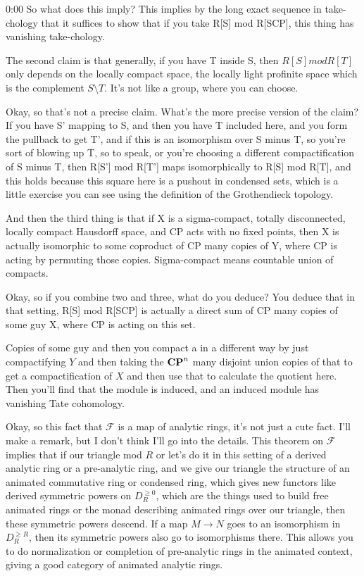 \begin{unfinished}{0:00}
So what does this imply? This implies by the long exact sequence in take-chology that it suffices to show that if you take R[S] mod R[SCP], this thing has vanishing take-chology.

The second claim is that generally, if you have T inside S, then $R[S] mod R[T]$ only depends on the locally compact space, the locally light profinite space which is the complement $S\setminus T$. It's not like a group, where you can choose.

Okay, so that's not a precise claim. What's the more precise version of the claim? If you have S' mapping to S, and then you have T included here, and you form the pullback to get T', and if this is an isomorphism over S minus T, so you're sort of blowing up T, so to speak, or you're choosing a different compactification of S minus T, then R[S'] mod R[T'] maps isomorphically to R[S] mod R[T], and this holds because this square here is a pushout in condensed sets, which is a little exercise you can see using the definition of the Grothendieck topology.

And then the third thing is that if X is a sigma-compact, totally disconnected, locally compact Hausdorff space, and CP acts with no fixed points, then X is actually isomorphic to some coproduct of CP many copies of Y, where CP is acting by permuting those copies. Sigma-compact means countable union of compacts.

Okay, so if you combine two and three, what do you deduce? You deduce that in that setting, R[S] mod R[SCP] is actually a direct sum of CP many copies of some guy X, where CP is acting on this set.

Copies of some guy and then you compact a in a different way by just compactifying $Y$ and then taking the $\mathbf{CP}^n$ many disjoint union copies of that to get a compactification of $X$ and then use that to calculate the quotient here. Then you'll find that the module is induced, and an induced module has vanishing Tate cohomology.

Okay, so this fact that $\mathcal{F}$ is a map of analytic rings, it's not just a cute fact. I'll make a remark, but I don't think I'll go into the details. This theorem on $\mathcal{F}$ implies that if our triangle mod $R$ or let's do it in this setting of a derived analytic ring or a pre-analytic ring, and we give our triangle the structure of an animated commutative ring or condensed ring, which gives new functors like derived symmetric powers on $D^{\geq 0}_R$, which are the things used to build free animated rings or the monad describing animated rings over our triangle, then these symmetric powers descend. If a map $M \to N$ goes to an isomorphism in $D^{\geq R}_R$, then its symmetric powers also go to isomorphisms there. This allows you to do normalization or completion of pre-analytic rings in the animated context, giving a good category of animated analytic rings.


\end{unfinished}
